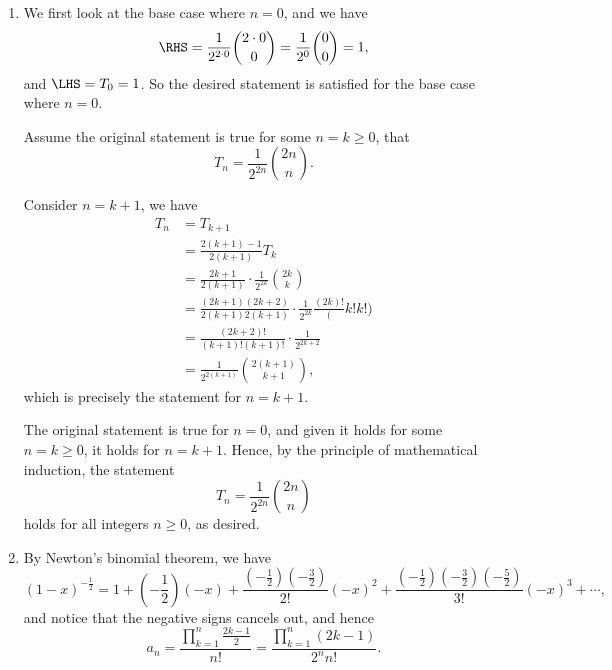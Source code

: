 \Question{\currfilebase}

\begin{enumerate}
    \item We first look at the base case where \(n = 0\), and we have
          \begin{align*}
              \RHS = \frac{1}{2^{2 \cdot 0}} \binom{2 \cdot 0}{0} = \frac{1}{2^0} \binom{0}{0} = 1,
          \end{align*}
          and \(\LHS = T_0 = 1\). So the desired statement is satisfied for the base case where \(n = 0\).

          Assume the original statement is true for some \(n = k \geq 0\), that
          \[
              T_n = \frac{1}{2^{2n}} \binom{2n}{n}.
          \]

          Consider \(n = k + 1\), we have
          \begin{align*}
              T_n & = T_{k + 1}                                                                              \\
                  & = \frac{2(k + 1) - 1}{2(k + 1)} T_k                                                      \\
                  & = \frac{2k + 1}{2(k + 1)} \cdot \frac{1}{2^{2k}} \binom{2k}{k}                           \\
                  & = \frac{(2k + 1) (2k + 2)}{2(k + 1) 2 (k + 1)} \cdot \frac{1}{2^{2k}} \frac{(2k)!}(k!k!) \\
                  & = \frac{(2k + 2)!}{(k + 1)! (k + 1)!} \cdot \frac{1}{2^{2k + 2}}                         \\
                  & = \frac{1}{2^{2(k + 1)}} \binom{2 (k + 1)}{k + 1},
          \end{align*}
          which is precisely the statement for \(n = k + 1\).

          The original statement is true for \(n = 0\), and given it holds for some \(n = k \geq 0\), it holds for \(n = k + 1\). Hence, by the principle of mathematical induction, the statement
          \[
              T_n = \frac{1}{2^{2n}} \binom{2n}{n}
          \]
          holds for all integers \(n \geq 0\), as desired.

    \item By Newton's binomial theorem, we have
          \[
              (1 - x)^{-\frac{1}{2}} = 1 + \left(- \frac{1}{2}\right) (-x) + \frac{\left(-\frac{1}{2}\right) \left(-\frac{3}{2}\right)}{2!} (-x)^2 + \frac{\left(-\frac{1}{2}\right) \left(-\frac{3}{2}\right) \left(-\frac{5}{2}\right)}{3!} (-x)^3 + \cdots,
          \]
          and notice that the negative signs cancels out, and hence
          \[
              a_n = \frac{\prod_{k = 1}^{n} \frac{2k - 1}{2}}{n!} = \frac{\prod_{k = 1}^{n}(2k - 1)}{2^n n!}.
          \]


\end{enumerate}
